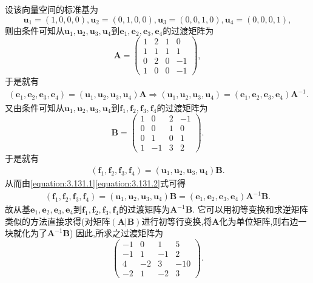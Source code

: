 \documentclass[../../main.tex]{subfiles}%
\begin{document}
\begin{solution}
设该向量空间的标准基为
\[
\boldsymbol{u}_1=(1,0,0,0),\boldsymbol{u}_2=(0,1,0,0),\boldsymbol{u}_3=(0,0,1,0),\boldsymbol{u}_4=(0,0,0,1),
\]
则由条件可知从\(\boldsymbol{u}_1,\boldsymbol{u}_2,\boldsymbol{u}_3,\boldsymbol{u}_4\)到\(\boldsymbol{e}_1,\boldsymbol{e}_2,\boldsymbol{e}_3,\boldsymbol{e}_4\)的过渡矩阵为
\[
\boldsymbol{A}=\begin{pmatrix}
1&2&1&0\\
1&1&1&1\\
0&2&0&-1\\
1&0&0&-1
\end{pmatrix},
\]
于是就有
\begin{align}\label{equation:3.131.1}
\left( \boldsymbol{e}_1,\boldsymbol{e}_2,\boldsymbol{e}_3,\boldsymbol{e}_4 \right) =\left( \boldsymbol{u}_1,\boldsymbol{u}_2,\boldsymbol{u}_3,\boldsymbol{u}_4 \right) \boldsymbol{A}\Rightarrow \left( \boldsymbol{u}_1,\boldsymbol{u}_2,\boldsymbol{u}_3,\boldsymbol{u}_4 \right) =\left( \boldsymbol{e}_1,\boldsymbol{e}_2,\boldsymbol{e}_3,\boldsymbol{e}_4 \right) \boldsymbol{A}^{-1}.
\end{align}
又由条件可知从\(\boldsymbol{u}_1,\boldsymbol{u}_2,\boldsymbol{u}_3,\boldsymbol{u}_4\)到\(\boldsymbol{f}_1,\boldsymbol{f}_2,\boldsymbol{f}_3,\boldsymbol{f}_4\)的过渡矩阵为
\[
\boldsymbol{B}=\begin{pmatrix}
1&0&2&-1\\
0&0&1&0\\
0&1&0&1\\
1&-1&3&2
\end{pmatrix}.
\]
于是就有
\begin{align}\label{equation:3.131.2}
\left( \boldsymbol{f}_1,\boldsymbol{f}_2,\boldsymbol{f}_3,\boldsymbol{f}_4 \right) =\left( \boldsymbol{u}_1,\boldsymbol{u}_2,\boldsymbol{u}_3,\boldsymbol{u}_4 \right) \boldsymbol{B}.
\end{align}
从而由\eqref{equation:3.131.1}\eqref{equation:3.131.2}式可得
\begin{align*}
\left( \boldsymbol{f}_1,\boldsymbol{f}_2,\boldsymbol{f}_3,\boldsymbol{f}_4 \right) =\left( \boldsymbol{u}_1,\boldsymbol{u}_2,\boldsymbol{u}_3,\boldsymbol{u}_4 \right) \boldsymbol{B}=\left( \boldsymbol{e}_1,\boldsymbol{e}_2,\boldsymbol{e}_3,\boldsymbol{e}_4 \right) \boldsymbol{A}^{-1}\boldsymbol{B}.
\end{align*}
故从基\(\boldsymbol{e}_1,\boldsymbol{e}_2,\boldsymbol{e}_3,\boldsymbol{e}_4\)到\(\boldsymbol{f}_1,\boldsymbol{f}_2,\boldsymbol{f}_3,\boldsymbol{f}_4\)的过渡矩阵为\(\boldsymbol{A}^{-1}\boldsymbol{B}\). 它可以用初等变换和求逆矩阵类似的方法直接求得(对矩阵\((\boldsymbol{A}|\boldsymbol{B})\)进行初等行变换,将\(\boldsymbol{A}\)化为单位矩阵,则右边一块就化为了\(\boldsymbol{A}^{-1}\boldsymbol{B}\))
因此,所求之过渡矩阵为
\[
\begin{pmatrix}
-1&0&1&5\\
-1&1&-1&2\\
4&-2&3&-10\\
-2&1&-2&3
\end{pmatrix}.
\] 

\end{solution}
\end{document}
